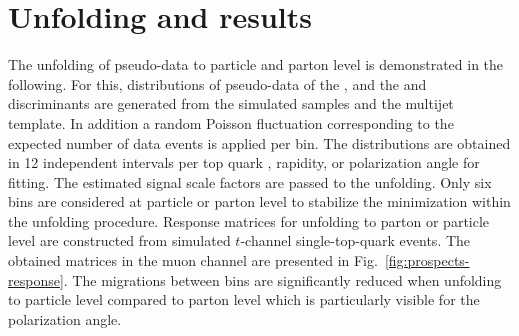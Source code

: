 \section{Unfolding and results}

The unfolding of pseudo-data to particle and parton level is demonstrated in the following. For this, distributions of pseudo-data of the \mtw, and the \bdttt and \bdttch discriminants are generated from the simulated samples and the multijet template. In addition a random Poisson fluctuation corresponding to the expected number of data events is applied per bin. The distributions are obtained in 12 independent intervals per top quark \pt, rapidity, or polarization angle for fitting. The estimated signal scale factors are passed to the unfolding. Only six bins are considered at particle or parton level to stabilize the minimization within the \TUNFOLD unfolding procedure. Response matrices for unfolding to parton or particle level are constructed from simulated $t$-channel single-top-quark events. The obtained matrices in the muon channel are presented in Fig.~\ref{fig:prospects-response}. The migrations between bins are significantly reduced when unfolding to particle level compared to parton level which is particularly visible for the polarization angle.


